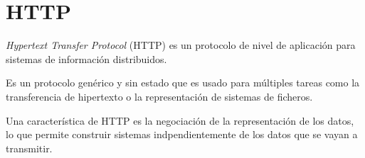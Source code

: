 
\section{HTTP}

\emph{Hypertext Transfer Protocol} (HTTP) es un protocolo de nivel de aplicación para sistemas de información distribuidos.

Es un protocolo genérico y sin estado que es usado para múltiples tareas como la transferencia de hipertexto o la representación de sistemas de ficheros.

Una característica de HTTP es la negociación de la representación de los datos, lo que permite construir sistemas indpendientemente de los datos que se vayan a transmitir. \emph{\parencite{Reference18}}
